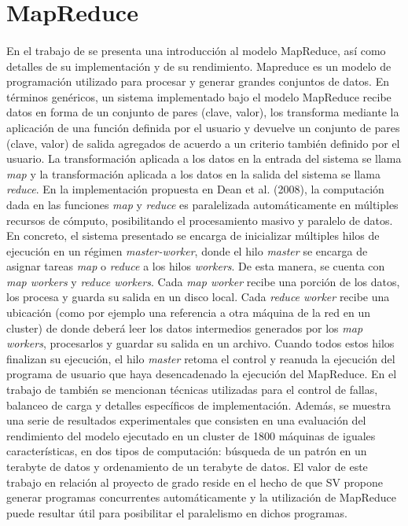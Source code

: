 \section{MapReduce} \label{section-trabajos-relacionados-mapreduce}

\paragraph{}En el trabajo de \citet{mapreduce} se presenta una introducción al modelo MapReduce, así como detalles de su implementación y de su rendimiento.
Mapreduce es un modelo de programación utilizado para procesar y generar grandes conjuntos de datos.
En términos genéricos, un sistema implementado bajo el modelo MapReduce recibe datos en forma de un conjunto de pares (clave, valor), los transforma mediante la aplicación de una función definida por el usuario y devuelve un conjunto de pares (clave, valor) de salida agregados de acuerdo a un criterio también definido por el usuario.
La transformación aplicada a los datos en la entrada del sistema se llama \textit{map} y la transformación aplicada a los datos en la salida del sistema se llama \textit{reduce}.
En la implementación propuesta en Dean et al.
(2008), la computación dada en las funciones \textit{map} y \textit{reduce} es paralelizada automáticamente en múltiples recursos de cómputo, posibilitando el procesamiento masivo y paralelo de datos.
En concreto, el sistema presentado se encarga de inicializar múltiples hilos de ejecución en un régimen \textit{master-worker}, donde el hilo \textit{master} se encarga de asignar tareas \textit{map} o \textit{reduce} a los hilos \textit{workers}.
De esta manera, se cuenta con \textit{map workers} y \textit{reduce workers}.
Cada \textit{map worker} recibe una porción de los datos, los procesa y guarda su salida en un disco local.
Cada \textit{reduce worker} recibe una ubicación (como por ejemplo una referencia a otra máquina de la red en un cluster) de donde deberá leer los datos intermedios generados por los \textit{map workers}, procesarlos y guardar su salida en un archivo.
Cuando todos estos hilos finalizan su ejecución, el hilo \textit{master} retoma el control y reanuda la ejecución del programa de usuario que haya desencadenado la ejecución del MapReduce.
En el trabajo de \cite{mapreduce} también se mencionan técnicas utilizadas para el control de fallas, balanceo de carga y detalles específicos de implementación.
Además, se muestra una serie de resultados experimentales que consisten en una evaluación del rendimiento del modelo ejecutado en un cluster de 1800 máquinas de iguales características, en dos tipos de computación: búsqueda de un patrón en un terabyte de datos y ordenamiento de un terabyte de datos. 
El valor de este trabajo en relación al proyecto de grado reside en el hecho de que SV propone generar programas concurrentes automáticamente y la utilización de MapReduce puede resultar útil para posibilitar el paralelismo en dichos programas.

